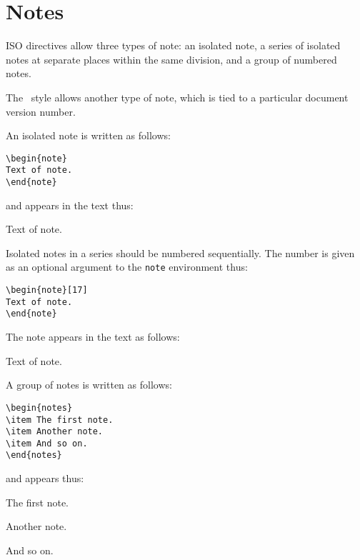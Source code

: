 \section{Notes}
ISO directives allow three types of note: an isolated note, a series of
isolated notes at separate places within the same division, and a group of
numbered notes.

The \iso\ style allows another type of note, which is tied to a particular
document version number.

An isolated note is written as follows:
\begin{verbatim}
\begin{note}
Text of note.
\end{note}
\end{verbatim}
and appears in the text thus:
\begin{note}
Text of note.
\end{note}

Isolated notes in a series should be numbered sequentially.
The number is given as an optional argument to the \verb|note|
environment thus:
\begin{verbatim}
\begin{note}[17]
Text of note.
\end{note}
\end{verbatim}
The note appears in the text as follows:
\begin{note}[17]
Text of note.
\end{note}

A group of notes is written as follows:
\begin{verbatim}
\begin{notes}
\item The first note.
\item Another note.
\item And so on.
\end{notes}
\end{verbatim}
and appears thus:
\begin{notes}
\item The first note.
\item Another note.
\item And so on.
\end{notes}

